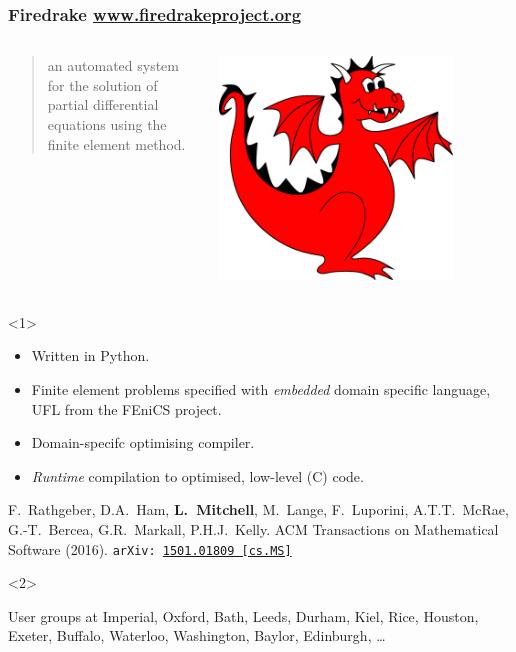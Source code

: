 \documentclass[presentation,aspectratio=43, 10pt]{beamer}
\newcommand{\arxivlink}[2]{{\texttt{arXiv:\,\href{https://arxiv.org/abs/#1}{#1\,[#2]}}}}
\begin{document}
\begin{frame}
  \frametitle{Firedrake \url{www.firedrakeproject.org}}
  \begin{columns}
    \begin{column}{0.8\textwidth}
      \begin{quote}
        {\normalfont [\ldots]} an automated system for the solution of
        partial differential equations using the finite element
        method.
      \end{quote}
    \end{column}
    \begin{column}{0.2\textwidth}
      \includegraphics[width=0.8\textwidth]{firedrake}
    \end{column}
  \end{columns}
  \begin{overlayarea}{\textwidth}{0.6\textheight}
    \begin{onlyenv}<1>
      \begin{itemize}
      \item Written in Python.
      \item Finite element problems specified with \emph{embedded}
        domain specific language, UFL \parencite{Alnaes:2014} from the
        FEniCS project.
      \item Domain-specifc optimising compiler.
      \item \emph{Runtime} compilation to optimised, low-level (C)
        code.
      \end{itemize}
      \begin{flushright}
        {\scriptsize F.~Rathgeber, D.A.~Ham, \textbf{L.~Mitchell}, M.~Lange,
        F.~Luporini, A.T.T.~McRae, G.-T.~Bercea, G.R.~Markall,
        P.H.J.~Kelly. ACM Transactions on Mathematical Software
        (2016). \arxivlink{1501.01809}{cs.MS}\nocite{Rathgeber:2016}}
      \end{flushright}
  \end{onlyenv}
  \begin{onlyenv}<2>
    \begin{block}{User groups at}
      Imperial, Oxford, Bath, Leeds, Durham, Kiel, Rice, Houston,
      Exeter, Buffalo, Waterloo, Washington, Baylor, Edinburgh, \dots


\end{block}
\end{onlyenv}
\end{overlayarea}
\end{frame}
\end{document}
